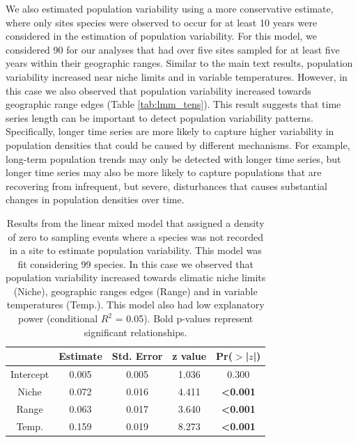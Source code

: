 We also estimated population variability using a more conservative estimate, where only sites species were observed to occur for at least 10 years were considered in the estimation of population variability. For this model, we considered 90 for our analyses that had over five sites sampled for at least five years within their geographic ranges. Similar to the main text results, population variability increased near niche limits and in variable temperatures. However, in this case we also observed that population variability increased towards geographic range edges (Table \ref{tab:lmm_tens}). This result suggests that time series length can be important to detect population variability patterns. Specifically, longer time series are more likely to capture higher variability in population densities that could be caused by different mechanisms. For example, long-term population trends may only be detected with longer time series, but longer time series may also be more likely to capture populations that are recovering from infrequent, but severe, disturbances that causes substantial changes in population densities over time. %

\begin{table}[ht]
\centering
\caption[Zero mixed effect model results]{Results from the linear mixed model that assigned a density of zero to sampling events where a species was not recorded in a site to estimate population variability. This model was fit considering 99 species. In this case we observed that population variability increased towards climatic niche limits (Niche), geographic ranges edges (Range) and in variable temperatures (Temp.). This model also had low explanatory power (conditional $R^2$ = 0.05). Bold p-values represent significant relationships.} 
  \vspace*{3mm}
\begin{tabular}{ccccc}
  \hline
 & Estimate & Std. Error & z value & Pr($>$|$z$|) \\ 
  \hline
  Intercept & 0.005 & 0.005 & 1.036 & 0.300 \\ 
  Niche & 0.072 & 0.016 & 4.411 & \textbf{<0.001} \\ 
  Range & 0.063 & 0.017 & 3.640 & \textbf{<0.001} \\ 
  Temp. & 0.159 & 0.019 & 8.273 & \textbf{<0.001} \\ 
   \hline
\end{tabular}
\label{tab:lmm_zeros}
\end{table}


